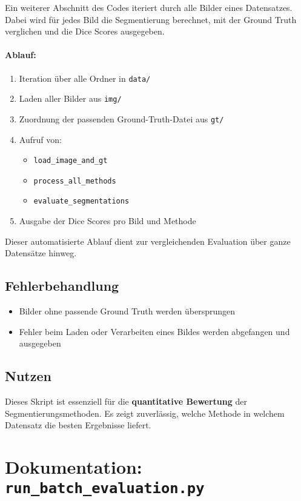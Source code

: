 \documentclass[a4paper,12pt]{article}
\begin{document}
Ein weiterer Abschnitt des Codes iteriert durch alle Bilder eines Datensatzes. Dabei wird für jedes Bild die Segmentierung berechnet, mit der Ground Truth verglichen und die Dice Scores ausgegeben.

\paragraph{Ablauf:}
\begin{enumerate}
  \item Iteration über alle Ordner in \texttt{data/}
  \item Laden aller Bilder aus \texttt{img/}
  \item Zuordnung der passenden Ground-Truth-Datei aus \texttt{gt/}
  \item Aufruf von:
    \begin{itemize}
      \item \texttt{load\_image\_and\_gt}
      \item \texttt{process\_all\_methods}
      \item \texttt{evaluate\_segmentations}
    \end{itemize}
  \item Ausgabe der Dice Scores pro Bild und Methode
\end{enumerate}

Dieser automatisierte Ablauf dient zur vergleichenden Evaluation über ganze Datensätze hinweg.

\subsection*{ Fehlerbehandlung}
\begin{itemize}
  \item Bilder ohne passende Ground Truth werden übersprungen
  \item Fehler beim Laden oder Verarbeiten eines Bildes werden abgefangen und ausgegeben
\end{itemize}

\subsection*{ Nutzen}

Dieses Skript ist essenziell für die \textbf{quantitative Bewertung} der Segmentierungsmethoden. Es zeigt zuverlässig, welche Methode in welchem Datensatz die besten Ergebnisse liefert.

\section*{ Dokumentation: \texttt{run\_batch\_evaluation.py}}
\end{document}

